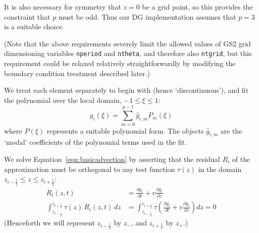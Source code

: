 \documentclass[10pt,a4paper]{article}
\newcommand{\dd}{\partial}
\begin{document}
It is also necessary for symmetry that $z=0$ be a grid point, so this provides
the constraint that $p$ must be odd. Thus our DG implementation assumes that
$p=3$ is a suitable choice.

(Note that the above requirements severely limit the allowed values of GS2
grid dimensioning variables \texttt{nperiod} and \texttt{ntheta}, and
therefore also \texttt{ntgrid}, but this requirement could be relaxed
relatively straightforwardly by modifying the boundary condition treatment
described later.)

We treat each element separately to begin with (hence `discontinuous'), and
fit the polynomial over the local domain, $-1 \leq \xi \leq 1$:
\[
g_i(\xi) = \sum_{m=0}^{p-1} \hat{g}_{i,m} P_m(\xi)
\]
where $P(\xi)$ represents a suitable polynomial form. The objects
$\hat{g}_{i,m}$ are the `modal' coefficients of the polynomial terms used in
the fit.

We solve Equation~\ref{eqn:basicadvection} by asserting that the residual $R_i$ of the
approximation must be orthogonal to any test function $\tau(z)$ in the domain
$z_{i-\frac{1}{2}} \leq z \leq z_{i+\frac{1}{2}}$:
\begin{align}
R_i(z,t) & = \frac{\dd g_i}{\dd t} + v \frac{\dd g_i}{\dd z} \nonumber \\
\int_{{z_{i-\frac{1}{2}}}}^{z_{i+\frac{1}{2}}} \tau(z) \, R_i(z,t) \, dz & =
\int_{{z_{i-\frac{1}{2}}}}^{z_{i+\frac{1}{2}}} \tau \left( \frac{\dd g_i}{\dd t} +
  v \frac{\dd g_i}{\dd z} \right) dz = 0
\label{eqn:residual}
\end{align}
(Henceforth we will represent $z_{i-\frac{1}{2}}$ by $z_-$, and
$z_{i+\frac{1}{2}}$ by $z_+$.)
\end{document}
